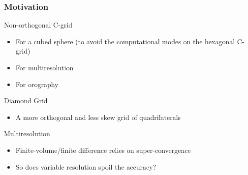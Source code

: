 \begin{frame}
\frametitle{Motivation}

\begin{block}{Non-orthogonal C-grid}
\pause
\begin{itemize}
\item For a cubed sphere (to avoid the computational modes on the hexagonal C-grid)
\item For multiresolution
\item For orography   
\end{itemize}
\pause
\end{block}

\begin{block}{Diamond Grid}
\pause
\begin{itemize}
\item A more orthogonal and less skew grid of quadrilaterals
\end{itemize}
\pause

\end{block}
\begin{block}{Multiresolution}
\pause

\begin{itemize}
\item Finite-volume/finite difference relies on super-convergence
\item So does variable resolution spoil the accuracy?
\end{itemize}
\end{block}
\end{frame}

